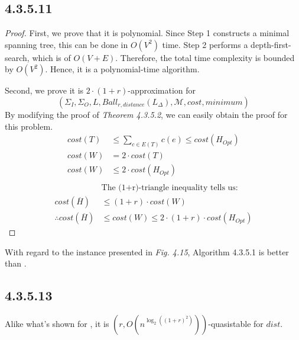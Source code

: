\documentclass[twocolumn, 10.5pt]{article}
\begin{document}
	\subsection*{4.3.5.11}
	\begin{proof}
		First, we prove that it is polynomial. Since Step 1 constructs a minimal spanning tree, this can be done in $O(V^2)$ time. Step 2 performs a depth-first-search, which is of $O(V+E)$. Therefore, the total time complexity is bounded by $O(V^2)$. Hence, it is a polynomial-time algorithm.	\par 
		Second, we prove it is $2\cdot (1+r)$-approximation for $$(\Sigma_I,\Sigma_O,L,Ball_{r,distance}(L_\Delta),\mathcal{M},cost,minimum)$$
		By modifying the proof of \emph{Theorem 4.3.5.2}, we can easily obtain the proof for this problem.
		\[
		\begin{aligned}
			cost(T)&\le \sum_{c\in E(T)}c(e)\le cost(H_{Opt})\\
			cost(W)&=2\cdot cost(T)\\
			cost(W)&\le 2\cdot cost(H_{Opt})\\
		\end{aligned}
		\]
		\[
		\begin{aligned}
			&\text{The (1+r)-triangle inequality tells us:}\\
			cost(\overline{H})&\le (1+r)\cdot cost(W)\\
			\therefore cost(\overline{H})&\le cost(W)\le 2\cdot(1+r)\cdot cost(H_{Opt})
		\end{aligned}
		\]
	\end{proof}
	With regard to the instance presented in \emph{Fig. 4.15}, Algorithm 4.3.5.1 is better than .
	\subsection*{4.3.5.13}
	Alike what's shown for , it is
	$(r,O(n^{\log_2 ((1+r)^2)}))$-quasistable for $dist$.
\end{document}
